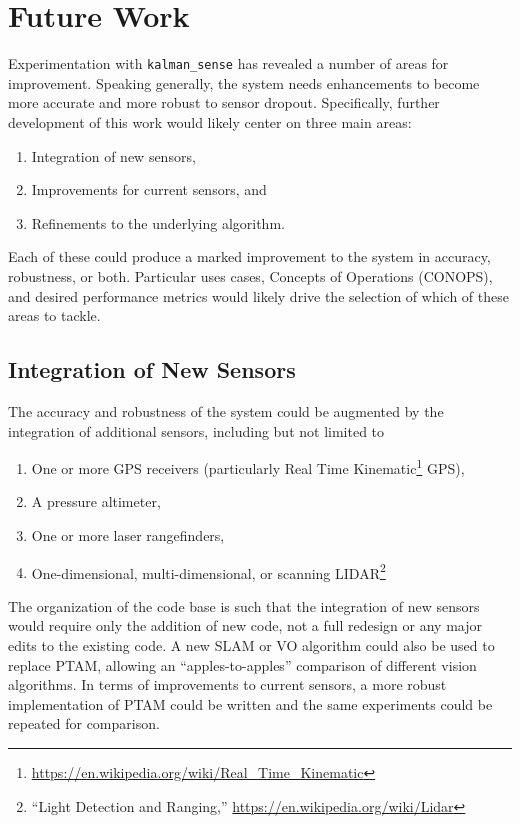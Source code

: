 \chapter{Future Work}

Experimentation with \texttt{kalman\_sense} has revealed a number of areas for improvement. Speaking generally, the system needs enhancements to become more accurate and more robust to sensor dropout. Specifically, further development of this work would likely center on three main areas:
\begin{enumerate}
\item Integration of new sensors,
\item Improvements for current sensors, and
\item Refinements to the underlying algorithm.
\end{enumerate}
Each of these could produce a marked improvement to the system in accuracy, robustness, or both. Particular uses cases, Concepts of Operations (CONOPS), and desired performance metrics would likely drive the selection of which of these areas to tackle.

\section{Integration of New Sensors}
The accuracy and robustness of the system could be augmented by the integration of additional sensors, including but not limited to
\begin{enumerate}
\item One or more GPS receivers (particularly Real Time Kinematic\footnote{\url{https://en.wikipedia.org/wiki/Real_Time_Kinematic}} GPS),
\item A pressure altimeter,
\item One or more laser rangefinders,
\item One-dimensional, multi-dimensional, or scanning LIDAR\footnote{``Light Detection and Ranging,'' \url{https://en.wikipedia.org/wiki/Lidar}}
\end{enumerate}
The organization of the code base is such that the integration of new sensors would require only the addition of new code, not a full redesign or any major edits to the existing code. A new SLAM or VO algorithm could also be used to replace PTAM, allowing an ``apples-to-apples'' comparison of different vision algorithms. In terms of improvements to current sensors, a more robust implementation of PTAM could be written and the same experiments could be repeated for comparison.

